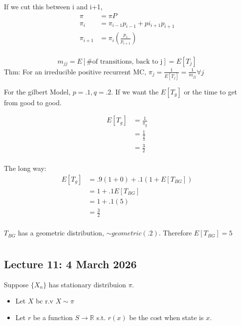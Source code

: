 \documentclass{report}
\begin{document}
If we cut this between i and i+1, 
\begin{align*}
	\pi &= \pi P \\
	\pi_{i}& = \pi_{i-1}p_{i-1} + pi_{i+1}p_{i+1}\\
	\pi_{i+1} &= \pi_{i}(\frac{p_{1}}{p_{i+1}})\\
\end{align*}

\vspace{5mm}
\[
m_{jj} = E[\text{\# of transitions, back to j}] = E[T_{j}]
\]
Thm: For an irreducible positive recurrent MC, $ \pi_{j} = \frac{1}{E[T_{j}]} = \frac{1}{m_{jj}} \forall j $ 

For the gilbert Model, $ p=.1, q=.2 $. If we want the $ E[T_{g}] $ or the time to get from good to good. 

\begin{align*}
E[T_{g}] &=  \frac{1}{\pi_{g}} \\
&= \frac{1}{\frac{2}{3}} \\ 
&= \frac{3}{2} \\ 
\end{align*}

The long way: 
\begin{align*}
	E[T_{g}] &= .9(1 + 0) + .1(1+ E[T_{BG}]) \\
	&= 1 + .1E[T_{BG}] \\
	&= 1 + .1(5) \\
	&= \frac{3}{2} \\
\end{align*}

$ T_{BG} $ has a geometric distribution, $ \sim geometric(.2) $. Therefore $ E[T_{BG}] = 5 $ 

\chapter{}
\section{Lecture 11: 4 March 2026}

Suppose $ \{X_{n}\} $ has stationary distribuion $ \pi $. 

\begin{itemize}
	\item Let $ X $ bc r.v $ X \sim \pi $ 
	\item Let $ r $ be a function $ S \to \mathbb{R} $ s.t. $ r(x) $ be the cost when state is $ x $. 
\end{itemize}
\end{document}
